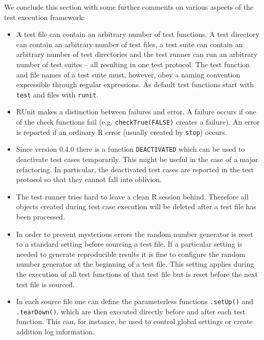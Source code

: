 \documentclass[12pt, a4paper]{article}
\begin{document}
 We conclude this section with some further comments on various aspects of the test execution framework:
\begin{itemize}
\item{A test file can contain an arbitrary number of test functions. A test directory can contain an arbitrary number of test files, a test suite can contain an arbitrary number of test directories and the test runner can run an arbitrary number of test suites -- all resulting in one test protocol. The test function and file names of a test suite must, however,  obey a naming convention expressible through regular expressions.
    As default test functions start with {\tt test} and files with {\tt runit}.}
\item{RUnit makes a distinction between failures and error. A failure occurs if one of the check functions fail (e.g. {\tt checkTrue(FALSE)} creates a failure). An error is reported if an ordinary R error (usually created by {\tt stop}) occurs.}
\item{Since version 0.4.0 there is a function {\tt DEACTIVATED} which
can be used to deactivate test cases temporarily. This might be useful
in the case of a major refactoring. In particular, the deactivated
test cases are reported in the test protocol so that they cannot fall
into oblivion.}
\item{The test runner tries hard to leave a clean R session behind. Therefore all objects created during test case execution will be deleted after a test file has been processed.}
\item{In order to prevent mysterious errors the random number generator is reset to a standard setting before sourcing a test file. If a particular setting is needed to generate reproducible results it is fine to configure the random number generator at the beginning of a test file. This setting applies during the execution of all test functions of that test file but is reset before the next test file is sourced.}
\item{In each source file one can define the parameterless functions {\tt .setUp()} and {\tt .tearDown()}.
which are then executed directly before and after each test function. This can, for instance, be used to control global settings or create addition log information.}

\end{itemize}
\end{document}
